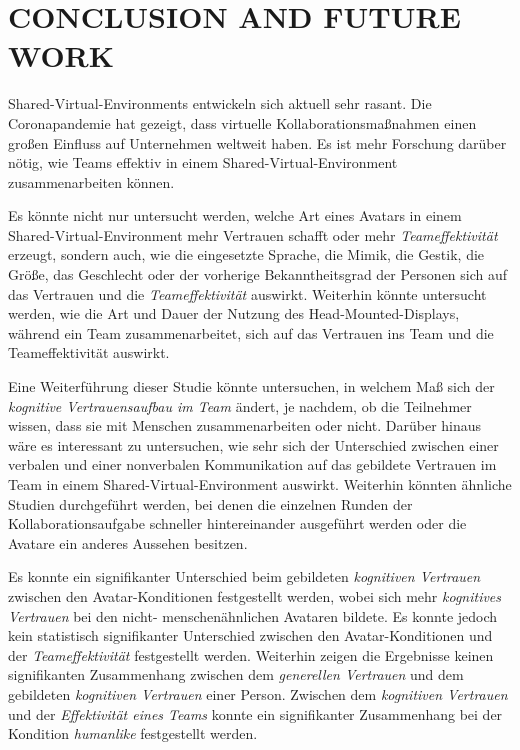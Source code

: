 \documentclass[sigchi]{acmart}
\begin{document}
\section{CONCLUSION AND FUTURE WORK}
Shared-Virtual-Environments entwickeln sich aktuell sehr rasant. Die Coronapandemie hat gezeigt, dass virtuelle Kollaborationsmaßnahmen einen großen Einfluss auf Unternehmen weltweit haben. Es ist mehr Forschung darüber nötig, wie Teams effektiv in einem Shared-Virtual-Environment zusammenarbeiten können.

Es könnte nicht nur untersucht werden, welche Art eines Avatars in einem Shared-Virtual-Environment mehr Vertrauen schafft oder mehr \textit{Teameffektivität} erzeugt, sondern auch, wie die eingesetzte Sprache, die Mimik, die Gestik, die Größe, das Geschlecht oder der vorherige Bekanntheitsgrad der Personen sich auf das Vertrauen und die \textit{Teameffektivität} auswirkt.
Weiterhin könnte untersucht werden, wie die Art und Dauer der Nutzung des Head-Mounted-Displays, während ein Team zusammenarbeitet, sich auf das Vertrauen ins Team und die Teameffektivität auswirkt.

Eine Weiterführung dieser Studie könnte untersuchen, in welchem Maß sich der \textit{kognitive Vertrauensaufbau im Team} ändert, je nachdem, ob die Teilnehmer wissen, dass sie mit Menschen zusammenarbeiten oder nicht. Darüber hinaus wäre es interessant zu untersuchen, wie sehr sich der Unterschied zwischen einer verbalen und einer nonverbalen Kommunikation auf das gebildete Vertrauen im Team in einem Shared-Virtual-Environment auswirkt.  
Weiterhin könnten ähnliche Studien durchgeführt werden, bei denen die einzelnen Runden der Kollaborationsaufgabe schneller hintereinander ausgeführt werden oder die Avatare ein anderes Aussehen besitzen.

Es konnte ein signifikanter Unterschied beim gebildeten \textit{kognitiven Vertrauen} zwischen den Avatar-Konditionen festgestellt werden, wobei sich mehr \textit{kognitives Vertrauen} bei den nicht- menschenähnlichen Avataren bildete. Es konnte jedoch kein statistisch signifikanter Unterschied zwischen den Avatar-Konditionen und der \textit{Teameffektivität} festgestellt werden. Weiterhin zeigen die Ergebnisse keinen signifikanten Zusammenhang zwischen dem \textit{generellen Vertrauen} und dem gebildeten \textit{kognitiven Vertrauen} einer Person. Zwischen dem \textit{kognitiven Vertrauen} und der \textit{Effektivität eines Teams} konnte ein signifikanter Zusammenhang bei der Kondition \textit{humanlike} festgestellt werden.
\end{document}
